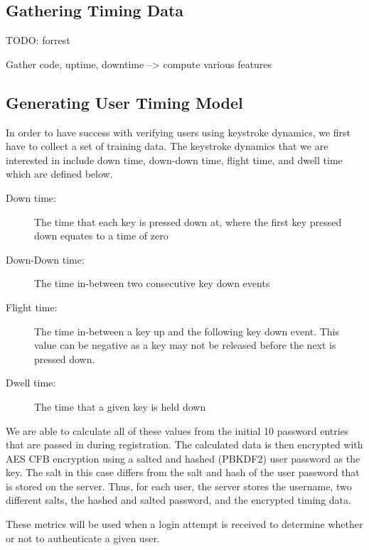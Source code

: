 \documentclass{article}
\begin{document}
\subsection{Gathering Timing Data}
TODO: forrest

Gather code, uptime, downtime --> compute various features

\subsection{Generating User Timing Model}
In order to have success with verifying users using keystroke dynamics, we first have to collect a set of training data. The keystroke dynamics that we are interested in include down time, down-down time, flight time, and dwell time which are defined below. 
\begin{description}
	\item[Down time:] The time that each key is pressed down at, where the first key pressed down equates to a time of zero
	\item[Down-Down time:] The time in-between two consecutive key down events
	\item[Flight time:] The time in-between a key up and the following key down event. This value can be negative as a key may not be released before the next is pressed down. 
	\item[Dwell time:] The time that a given key is held down
\end{description}
We are able to calculate all of these values from the initial 10 password entries that are passed in during registration. The calculated data is then encrypted with AES CFB encryption using a salted and hashed (PBKDF2) user password as the key. The salt in this case differs from the salt and hash of the user password that is stored on the server. Thus, for each user, the server stores the username, two different salts, the hashed and salted password, and the encrypted timing data.

These metrics will be used when a login attempt is received to determine whether or not to authenticate a given user.
\end{document}
